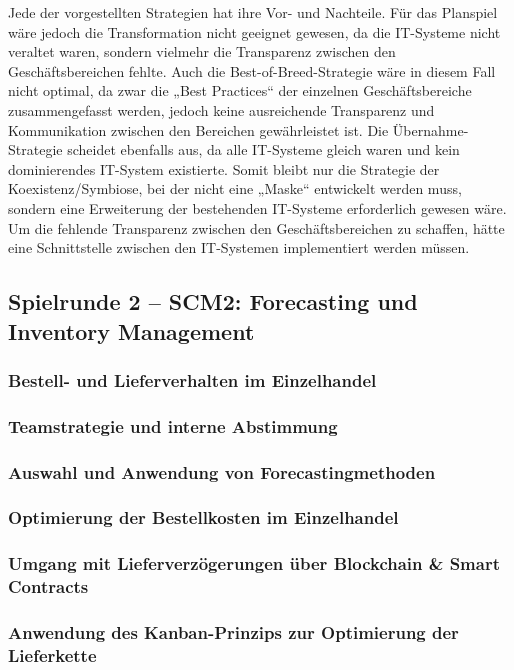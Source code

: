 \documentclass[a4paper,12pt]{article}
\begin{document}
Jede der vorgestellten Strategien hat ihre Vor- und Nachteile. Für das Planspiel wäre jedoch die Transformation nicht geeignet gewesen,
da die IT-Systeme nicht veraltet waren, sondern vielmehr die Transparenz zwischen den Geschäftsbereichen fehlte.
Auch die Best-of-Breed-Strategie wäre in diesem Fall nicht optimal, da zwar die „Best Practices“ der einzelnen Geschäftsbereiche zusammengefasst werden,
jedoch keine ausreichende Transparenz und Kommunikation zwischen den Bereichen gewährleistet ist.
Die Übernahme-Strategie scheidet ebenfalls aus, da alle IT-Systeme gleich waren und kein dominierendes IT-System existierte.
Somit bleibt nur die Strategie der Koexistenz/Symbiose, bei der nicht eine „Maske“ entwickelt werden muss,
sondern eine Erweiterung der bestehenden IT-Systeme erforderlich gewesen wäre. Um die fehlende Transparenz zwischen den Geschäftsbereichen zu schaffen,
hätte eine Schnittstelle zwischen den IT-Systemen implementiert werden müssen.

\newpage
\subsection{Spielrunde 2 – SCM2: Forecasting und Inventory Management}
\subsubsection{Bestell- und Lieferverhalten im Einzelhandel}
\subsubsection{Teamstrategie und interne Abstimmung}
\subsubsection{Auswahl und Anwendung von Forecastingmethoden}
\subsubsection{Optimierung der Bestellkosten im Einzelhandel}
\subsubsection{Umgang mit Lieferverzögerungen über Blockchain \& Smart Contracts}
\subsubsection{Anwendung des Kanban-Prinzips zur Optimierung der Lieferkette}
\end{document}
